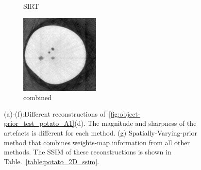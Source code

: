 \documentclass[journal]{IEEEtran}
\begin{document}
\begin{figure}[!h]
\begin{subfigure}[b]{0.24\linewidth}
        \caption{SIRT}
     \end{subfigure}
    \begin{subfigure}[b]{0.24\linewidth}
        \includegraphics[width=\textwidth]{../images/potato/2D/weighted_pca_all_methods30.png}
        \caption{combined}
     \end{subfigure}
      \caption{(a)-(f):Different reconstructions of~\ref{fig:object-prior_test_potato_A1}(d). The magnitude and sharpness of the artefacts is different for each method. (g) Spatially-Varying-prior method that combines weights-map information from all other methods. The SSIM of these reconstructions is shown in Table.~\ref{table:potato_2D_ssim}.} 
\label{fig:reconstructions_diff_methods}
\end{figure}
\end{document}
